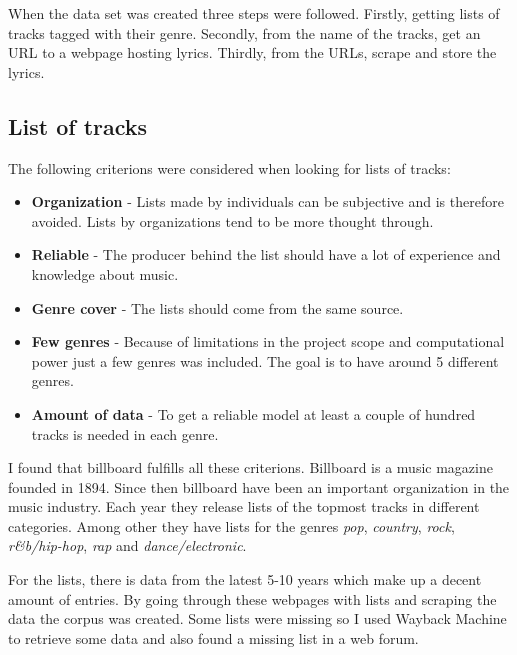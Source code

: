 \documentclass[a4paper, 12pt]{article}
\begin{document}
When the data set was created three steps were followed.
Firstly, getting lists of tracks tagged with their genre.
Secondly, from the name of the tracks, get an URL to a webpage hosting lyrics.
Thirdly, from the URLs, scrape and store the lyrics.

\subsection{List of tracks}
The following criterions were considered when looking for lists of tracks:
\begin{itemize}
    \item {\textbf{Organization} - Lists made by individuals can be subjective and is therefore avoided.
    Lists by organizations tend to be more thought through.}
    \item {\textbf{Reliable} - The producer behind the list should have a lot of experience and knowledge about music.}
    \item {\textbf{Genre cover} - The lists should come from the same source.
    }
    \item {\textbf{Few genres} - Because of limitations in the project scope and computational power just a few genres was included.
    The goal is to have around 5 different genres.}
    \item {\textbf{Amount of data} - To get a reliable model at least a couple of hundred tracks is needed in each genre.}
\end{itemize}

I found that billboard fulfills all these criterions.
Billboard is a music magazine founded in 1894.
Since then billboard have been an important organization in the music industry.
Each year they release lists of the topmost tracks in different categories.
Among other they have lists for the genres \textit{pop}, \textit{country}, \textit{rock}, \textit{r\&b/hip-hop}, \textit{rap} and \textit{dance/electronic}. \cite{billboard}

For the lists, there is data from the latest 5-10 years which make up a decent amount of entries.
By going through these webpages with lists and scraping the data the corpus was created.
Some lists were missing so I used Wayback Machine \cite{wayback} to retrieve some data and also found a missing list in a web forum.
\end{document}
